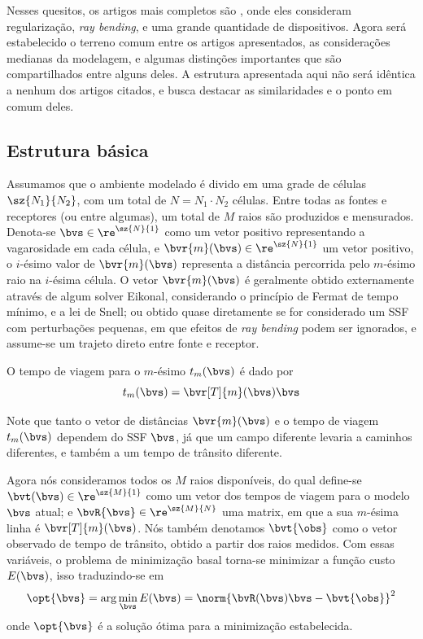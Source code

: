 Nesses quesitos, os artigos mais completos são \cite{ali_opensource_2019,phillips_traveltime_1991,hormati_robust_2010}, onde eles consideram regularização, \textit{ray bending}, e uma grande quantidade de dispositivos. Agora será estabelecido o terreno comum entre os artigos apresentados, as considerações medianas da modelagem, e algumas distinções importantes que são compartilhados entre alguns deles. A estrutura apresentada aqui não será idêntica a nenhum dos artigos citados, e busca destacar as similaridades e o ponto em comum deles.

\subsection{Estrutura básica}
Assumamos que o ambiente modelado é divido em uma grade de células $\sz{N_1}{N_2}$, com um total de $N = N_1 \cdot N_2$ células. Entre todas as fontes e receptores (ou entre algumas), um total de $M$ raios são produzidos e mensurados. Denota-se $\bvs \in \re^{\sz{N}{1}}$ como um vetor positivo representando a vagarosidade em cada célula, e $\bvr{m}(\bvs) \in \re^{\sz{N}{1}}$ um vetor positivo, o $i$-ésimo valor de $\bvr{m}(\bvs)$ representa a distância percorrida pelo $m$-ésimo raio na $i$-ésima célula. O vetor $\bvr{m}(\bvs)$ é geralmente obtido externamente através de algum solver Eikonal, considerando o princípio de Fermat de tempo mínimo, e a lei de Snell; ou obtido quase diretamente se for considerado um SSF com perturbações pequenas, em que efeitos de \textit{ray bending} podem ser ignorados, e assume-se um trajeto direto entre fonte e receptor.

O tempo de viagem para o $m$-ésimo $t_m(\bvs)$ é dado por
\begin{equation}
	t_m(\bvs) = \bvr[T]{m}(\bvs) \bvs
\end{equation}

Note que tanto o vetor de distâncias $\bvr{m}(\bvs)$ e o tempo de viagem $t_m(\bvs)$ dependem do SSF $\bvs$, já que um campo diferente levaria a caminhos diferentes, e também a um tempo de trânsito diferente.

Agora nós consideramos todos os $M$ raios disponíveis, do qual define-se $\bvt(\bvs) \in \re^{\sz{M}{1}}$ como um vetor dos tempos de viagem para o modelo $\bvs$ atual; e $\bvR{\bvs} \in \re^{\sz{M}{N}}$ uma matrix, em que a sua $m$-ésima linha é $\bvr[T]{m}(\bvs)$. Nós também denotamos $\bvt{\obs}$ como o vetor observado de tempo de trânsito, obtido a partir dos raios medidos. Com essas variáveis, o problema de minimização basal torna-se minimizar a função custo $E(\bvs)$, isso traduzindo-se em
\begin{equation}
	\opt{\bvs} = \arg\min_{\bvs} E(\bvs) = \norm{\bvR(\bvs) \bvs - \bvt{\obs}}^2
	\label{eq:sec2:def_minimization_bvz}
\end{equation}
onde $\opt{\bvs}$ é a solução ótima para a minimização estabelecida.

